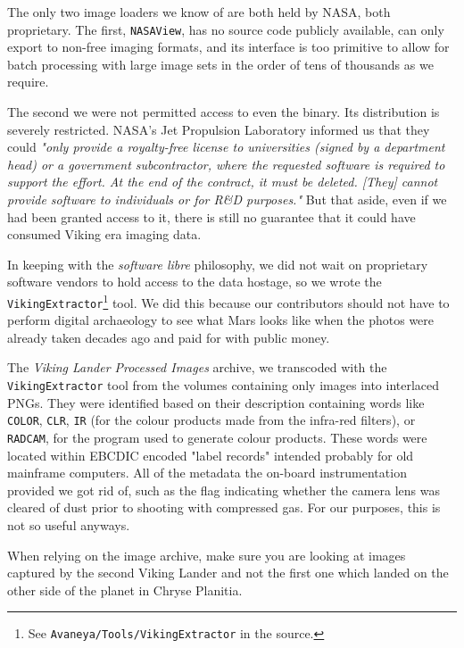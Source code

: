 The only two image loaders we know of are both held by NASA, both proprietary. The first, {\tt NASAView}, has no source code publicly available, can only export to non-free imaging formats, and its interface is too primitive to allow for batch processing with large image sets in the order of tens of thousands as we require. 

The second we were not permitted access to even the binary. Its distribution is severely restricted. NASA's Jet Propulsion Laboratory informed us that they could {\it "only provide a royalty-free license to universities (signed by a department head) or a government subcontractor, where the requested software is required to support the effort. At the end of the contract, it must be deleted. [They] cannot provide software to individuals or for R&D purposes."} But that aside, even if we had been granted access to it, there is still no guarantee that it could have consumed Viking era imaging data.

In keeping with the {\it software libre} philosophy, we did not wait on proprietary software vendors to hold access to the data hostage, so we wrote the {\tt VikingExtractor}\footnote{See {\tt Avaneya/Tools/VikingExtractor} in the source.} tool. We did this because our contributors should not have to perform digital archaeology to see what Mars looks like when the photos were already taken decades ago and paid for with public money.

The {\it Viking Lander Processed Images} archive, we transcoded with the {\tt VikingExtractor} tool from the volumes containing only images into interlaced PNGs. They were identified based on their description containing words like {\tt COLOR}, {\tt CLR}, {\tt IR} (for the colour products made from the infra-red filters), or {\tt RADCAM}, for the program used to generate colour products. These words were located within EBCDIC encoded "label records" intended probably for old mainframe computers. All of the metadata the on-board instrumentation provided we got rid of, such as the flag indicating whether the camera lens was cleared of dust prior to shooting with compressed gas. For our purposes, this is not so useful anyways.

When relying on the image archive, make sure you are looking at images captured by the second Viking Lander and not the first one which landed on the other side of the planet in Chryse Planitia.

\StopChapter


